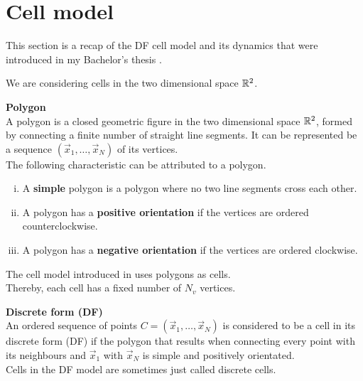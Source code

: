 \section{Cell model} 

This section is a recap of the DF cell model and its dynamics that were introduced in my Bachelor's thesis \cite{Vogel2023}.

We are considering cells in the two dimensional space $\mathbb{R}^2$. 

\begin{definition} \textbf{Polygon} \\
	A polygon is a closed geometric figure in the two dimensional space $\mathbb{R}^2$, formed by connecting a finite number of straight line segments. It can be represented be a sequence $(\vec{x}_1, \ldots, \vec{x}_N)$ of its vertices. \\
	The following characteristic can be attributed to a polygon.
	\begin{enumerate}[(i)]
		\item A \textbf{simple} polygon is a polygon where no two line segments cross each other.
		\item A polygon has a \textbf{positive orientation} if the vertices are ordered counterclockwise.
		\item A polygon has a \textbf{negative orientation} if the vertices are ordered clockwise.
	\end{enumerate}
\end{definition}

The cell model introduced in \cite{Vogel2023} uses polygons as cells. \\
Thereby, each cell has a fixed number of $N_{v}$ vertices. 


\begin{definition} \textbf{Discrete form (DF)} \label{def:DF}  \\
	An ordered sequence of points $C = (\vec{x}_1, \ldots , \vec{x}_N)$ is considered to be a cell in its discrete form (DF) if the polygon that results when connecting every point with its neighbours and $\vec{x}_1$ with $\vec{x}_N$ is simple and positively orientated. \\	
	Cells in the DF model are sometimes just called discrete cells. \\
\end{definition}








